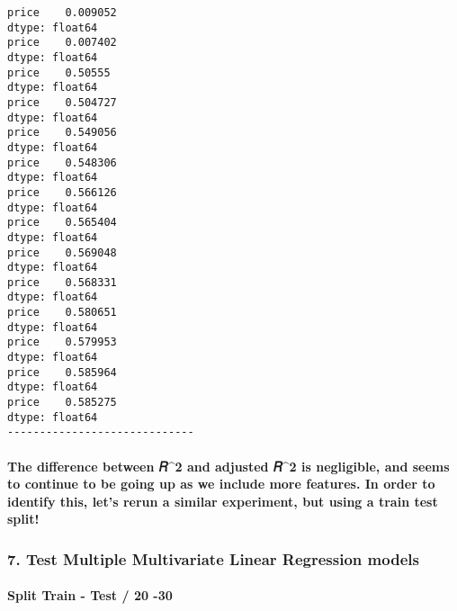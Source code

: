 \documentclass[11pt]{article}
\begin{document}
    \begin{Verbatim}[commandchars=\\\{\}]
price    0.009052
dtype: float64
price    0.007402
dtype: float64
price    0.50555
dtype: float64
price    0.504727
dtype: float64
price    0.549056
dtype: float64
price    0.548306
dtype: float64
price    0.566126
dtype: float64
price    0.565404
dtype: float64
price    0.569048
dtype: float64
price    0.568331
dtype: float64
price    0.580651
dtype: float64
price    0.579953
dtype: float64
price    0.585964
dtype: float64
price    0.585275
dtype: float64
-----------------------------

    \end{Verbatim}

    \paragraph{The difference between 𝑅\^{}2 and adjusted 𝑅\^{}2 is
negligible, and seems to continue to be going up as we include more
features. In order to identify this, let's rerun a similar experiment,
but using a train test
split!}\label{the-difference-between-ux1d4452-and-adjusted-ux1d4452-is-negligible-and-seems-to-continue-to-be-going-up-as-we-include-more-features.-in-order-to-identify-this-lets-rerun-a-similar-experiment-but-using-a-train-test-split}

    \subsubsection{7. Test Multiple Multivariate Linear Regression
models}\label{test-multiple-multivariate-linear-regression-models}

\paragraph{Split Train - Test / 20 -30}\label{split-train---test-20--30}
\end{document}
